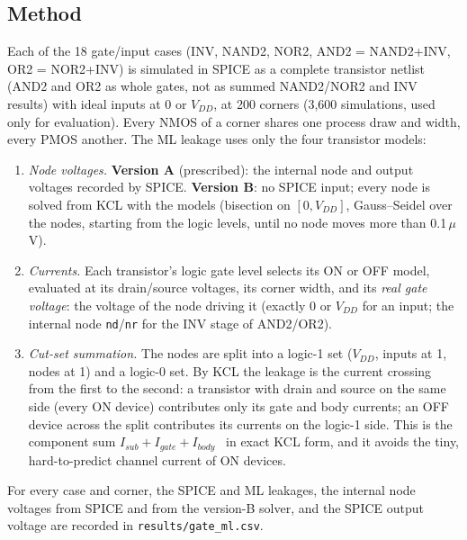 ﻿\documentclass[conference,10pt]{IEEEtran}
\newcommand{\cc}[1]{\texttt{#1}}
\begin{document}
\subsection{Method}
Each of the 18 gate/input cases (INV, NAND2, NOR2, AND2 = NAND2+INV, OR2 = NOR2+INV) is simulated
in SPICE as a complete transistor netlist (AND2 and OR2 as whole gates, not as summed NAND2/NOR2
and INV results) with ideal inputs at 0 or $V_{DD}$, at 200 corners
(3,600 simulations, used only for evaluation). Every NMOS of a corner shares one process draw and
width, every PMOS another. The ML leakage uses only the four transistor models:
\begin{enumerate}
\item \emph{Node voltages.} \textbf{Version A} (prescribed): the internal node and output voltages
recorded by SPICE. \textbf{Version B}: no SPICE input; every node is solved from KCL with the
models (bisection on $[0,V_{DD}]$, Gauss--Seidel over the nodes, starting from the logic levels,
until no node moves more than 0.1\,$\mu$V).
\item \emph{Currents.} Each transistor's logic gate level selects its ON or OFF model, evaluated at
its drain/source voltages, its corner width, and its \emph{real gate voltage}: the voltage of the
node driving it (exactly 0 or $V_{DD}$ for an input; the internal node \cc{nd}/\cc{nr} for the INV
stage of AND2/OR2).
\item \emph{Cut-set summation.} The nodes are split into a logic-1 set ($V_{DD}$, inputs at 1,
nodes at 1) and a logic-0 set. By KCL the leakage is the current crossing from the first to the
second: a transistor with drain and source on the same side (every ON device) contributes only its
gate and body currents; an OFF device across the split contributes its currents on the logic-1
side. This is the component sum $I_{sub}+I_{gate}+I_{body}$~\cite{roy03} in exact KCL form, and it avoids the
tiny, hard-to-predict channel current of ON devices.
\end{enumerate}
For every case and corner, the SPICE and ML leakages, the internal node voltages from SPICE and
from the version-B solver, and the SPICE output voltage are recorded in \cc{results/gate\_ml.csv}.
\end{document}
